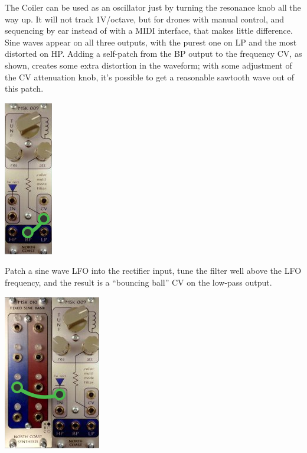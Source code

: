 \pagebreak

The Coiler can be used as an oscillator just by turning the resonance knob
all the way up.  It will not track 1V/octave, but for drones with manual
control, and sequencing by ear instead of with a MIDI interface, that makes
little difference.  Sine waves appear on all three outputs, with the purest
one on LP and the most distorted on HP.  Adding a self-patch from the BP
output to the frequency CV, as shown, creates some extra distortion in the
waveform; with some adjustment of the CV attenuation knob, it's possible to
get a reasonable sawtooth wave out of this patch.

\nopagebreak\noindent
{\hspace*{\fill}\includegraphics[scale=1.8]{patch4.png}\hspace*{\fill}\par} 

Patch a sine wave LFO into the rectifier input, tune the filter well above
the LFO frequency, and the result is a ``bouncing ball'' CV on the low-pass
output.

\nopagebreak\noindent
{\hspace*{\fill}\includegraphics[scale=1.8]{patch5.png}\hspace*{\fill}\par}

